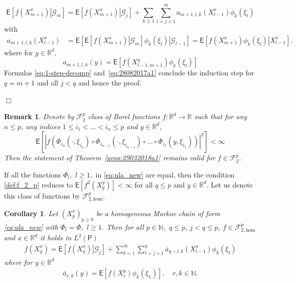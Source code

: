 \documentclass[bj]{imsart}
\def\PE{\mathsf{E}}
\def\nset{\mathbb{N}}
\def\rset{\mathbb{R}}
\def\rset{\mathbb{R}}
\newcommand{\proofendsign}{$\Box$}
\newtheorem{remark}{Remark}
\newtheorem{cor}{Corollary}
\newenvironment{proof}{{\noindent \bf Proof }}
 {{\hspace*{\fill}\proofendsign\par\bigskip}}
\begin{document}
\begin{proof}
\begin{equation}
\mathsf{E}\left[\left.f(X^x_{m+1})\right| \mathcal{G}_m \right]=\mathsf{E}\left[\left.f(X^x_{m+1})\right| \mathcal{G}_j \right]+\sum_{k\geq1}\sum_{l=j+1}^{m}a_{m+1,l,k}(X^x_{l-1})\phi_{k}(\xi_{l})
\end{equation}
with
\begin{align*}
a_{m+1,l,k}(X^x_{l-1}) &= \mathsf{E}\left[\left.\mathsf{E}\left[\left.f(X^x_{m+1})\right|\mathcal{G}_{m}\right]\phi_{k}(\xi_{l})\right|\mathcal{G}_{l-1}\right]
 = \mathsf{E}\left[\left.f(X^x_{m+1})\phi_{k}(\xi_{l})\right|X^x_{l-1}\right].
\end{align*}
where for $y \in \rset^d$,
\[
a_{m+1,l,k}(y) = \mathsf{E}\left[f(X^y_{l-1,m+1})\phi_{k}(\xi_{l})\right]
\]
Formulas \eqref{eq:1-step-decomp}
and~\eqref{eq:28082017a1} conclude the induction step for $q = m+1$ and all $j < q$ and hence the proof.
\end{proof}

\begin{remark}\label{rem:general_moments} Denote by $\mathcal{F}_2^p$ class of Borel functions $f: \rset^d \to \rset$ such that for any $n \leq p$, any indices $1 \leq i_1 < \ldots < i_n \leq p$ and $y \in \rset^d$,
\begin{equation}
\label{def:f_2_p}
\mathsf{E}\left[\left |f(\Phi_{i_n}(\cdot,\xi_{i_n})\circ\Phi_{i_{n-1}}(\cdot,\xi_{i_{n-1}})\circ\dots\circ\Phi_{i_{1}}(y,\xi_{i_{1}}))\right|^{2}\right]<\infty
\end{equation}
Then the statement of Theorem~\ref{prop:29032018a1} remains valid for $f \in \mathcal{F}_2^p$. 
\end{remark}

If  all the functions $\Phi_l,$ $l\geq 1,$ in \eqref{eq:ula_new} are equal, then the condition \eqref{def:f_2_p} reduces to $\PE \left[ f^2(X_q^y)\right] < \infty$ for all $q \leq p$ and $y \in \rset^d$. Let us denote this class of functions by $\mathcal{F}_{2,\text{hom}}^p$.

\begin{cor}
Let \((X^x_{p})_{p\geq 0}\) be a homogeneous Markov chain of form \eqref{eq:ula_new} with $\Phi_l = \Phi,$ $l\geq 1$. Then for all $p \in \nset,$ $q \leq p$, $j < q \leq p$, $f \in \mathcal{F}_{2,\text{hom}}^p$ and $x \in \rset^d$ it holds in \(L^2(\mathsf{P})\)
\begin{eqnarray*}
f(X^x_{q})=\mathsf{E}\left[\left.f(X^x_{q})\right|\mathcal G_{j}\right]+\sum_{k=1}^{\infty}\sum_{l=j+1}^{q}\bar a_{q-l,k}(X^x_{l-1})\phi_k\left(\xi_{l}\right)
\end{eqnarray*}
where for $y \in \rset^d$
\begin{eqnarray*}
\bar a_{r,k}(y)=\mathsf{E}\left[f(X^y_{r})\phi_k\left(\xi_{1}\right)\right], \quad r, k\in \mathbb{N}.
\end{eqnarray*}
\end{cor}
\end{document}
